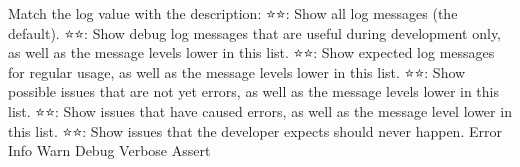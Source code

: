         Match the log value with the description:
            ⭐⭐: Show all log messages (the default).
            ⭐⭐: Show debug log messages that are useful during development only, as well as the message levels lower in this list.
            ⭐⭐: Show expected log messages for regular usage, as well as the message levels lower in this list.
            ⭐⭐: Show possible issues that are not yet errors, as well as the message levels lower in this list.
            ⭐⭐: Show issues that have caused errors, as well as the message level lower in this list.
            ⭐⭐: Show issues that the developer expects should never happen.
        Error
        Info
        Warn
        Debug
        Verbose
        Assert